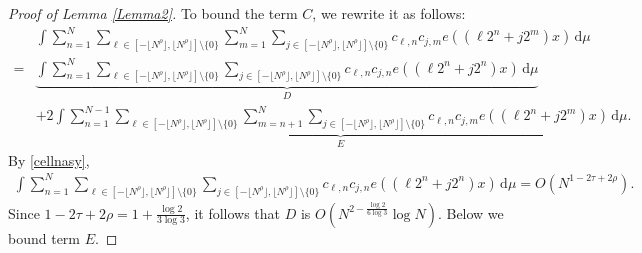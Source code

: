 \documentclass[10pt,a4paper]{amsart}
\numberwithin{equation}{section} %
\def\O{\mathcal{O}}
\begin{document}
\begin{proof}[Proof of Lemma \ref{Lemma2}]
	
	 To bound the term $C$, we rewrite it as follows:
	\begin{align*}
		&\int \sum_{n=1}^{N}\sum_{\ell\in [-\lfloor N^{\rho}\rfloor,\lfloor N^{ \rho}\rfloor]\setminus\{0\}}\sum_{m=1}^{N}\sum_{j\in [-\lfloor N^{\rho}\rfloor,\lfloor N^{ \rho}\rfloor]\setminus\{0\}}c_{\ell,n}c_{j,m}e((\ell 2^n+j2^m)x)\, \mathrm{d}\mu\\
		=&\underbrace{\int\sum_{n=1}^{N}\sum_{\ell \in [-\lfloor N^{\rho}\rfloor,\lfloor N^{ \rho}\rfloor]\setminus\{0\}}\sum_{j\in [-\lfloor N^{\rho}\rfloor,\lfloor N^{ \rho}\rfloor]\setminus\{0\}}c_{\ell,n}c_{j,n}e((\ell2^n+j2^n)x)\, \mathrm{d}\mu}_{D}\\
		&+2\underbrace{\int \sum_{n=1}^{N-1}\sum_{\ell \in [-\lfloor N^{ \rho}\rfloor,\lfloor N^{ \rho}\rfloor]\setminus\{0\}}\sum_{m=n+1}^{N}\sum_{j\in [-\lfloor N^{\rho}\rfloor,\lfloor N^{ \rho}\rfloor]\setminus\{0\}}c_{\ell,n}c_{j,m}e((\ell 2^n+j2^m)x)\, \mathrm{d}\mu}_{E}.
	\end{align*}
By \eqref{cellnasy},  
	\begin{equation*}
	\begin{aligned}
\int\sum_{n=1}^{N}\sum_{\ell\in [-\lfloor N^{ \rho}\rfloor,\lfloor N^{\rho}\rfloor]\setminus\{0\}}\sum_{j\in [-\lfloor N^{\rho}\rfloor,\lfloor N^{\rho}\rfloor]\setminus\{0\}}c_{\ell,n}c_{j,n}e((\ell 2^n+j2^n)x)\, \mathrm{d}\mu=O\left(N^{1-2\tau+2\rho}\right). 
   \end{aligned}
     \end{equation*}
    Since $1-2\tau+2\rho=1+\frac{\log2}{3\log3}$, it follows that $D$ is $O\left(N^{2-\frac{\log2}{6\log3}}\log N\right)$. Below we bound term $E$.
    

\end{proof}
\end{document}
